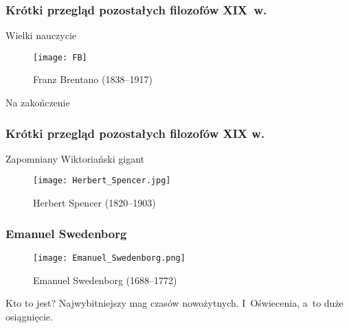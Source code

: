 \documentclass{beamer}  %
\begin{document}
\begin{frame}
  \frametitle{Krótki przegląd pozostałych filozofów XIX~w.}

  \begin{block}{Wielki nauczycie}
    \begin{figure}
      \centering

      \texttt{[image: FB]}
      \caption{Franz Brentano (1838--1917)}
    \end{figure}
  \end{block}

\end{frame}



\begin{frame}{Na zakończenie}
  \frametitle{Krótki przegląd pozostałych filozofów XIX w.}
  \begin{block}{Zapomniany Wiktoriański gigant}
    \begin{figure}
      \centering

      \texttt{[image: Herbert\_Spencer.jpg]}
      \caption{Herbert Spencer (1820--1903)}
    \end{figure}
  \end{block}
\end{frame}



\begin{frame}
  \frametitle{Emanuel Swedenborg}
  \begin{block}{}
    \begin{figure}
      \centering

      \texttt{[image: Emanuel\_Swedenborg.png]}
      \caption{Emanuel Swedenborg (1688--1772)}
    \end{figure}
  \end{block}

  \begin{block}{Kto to jest?}
    Najwybitniejszy mag czasów nowożytnych. I~Oświecenia, a~to duże
    osiągnięcie.
  \end{block}

\end{frame}
\end{document}
